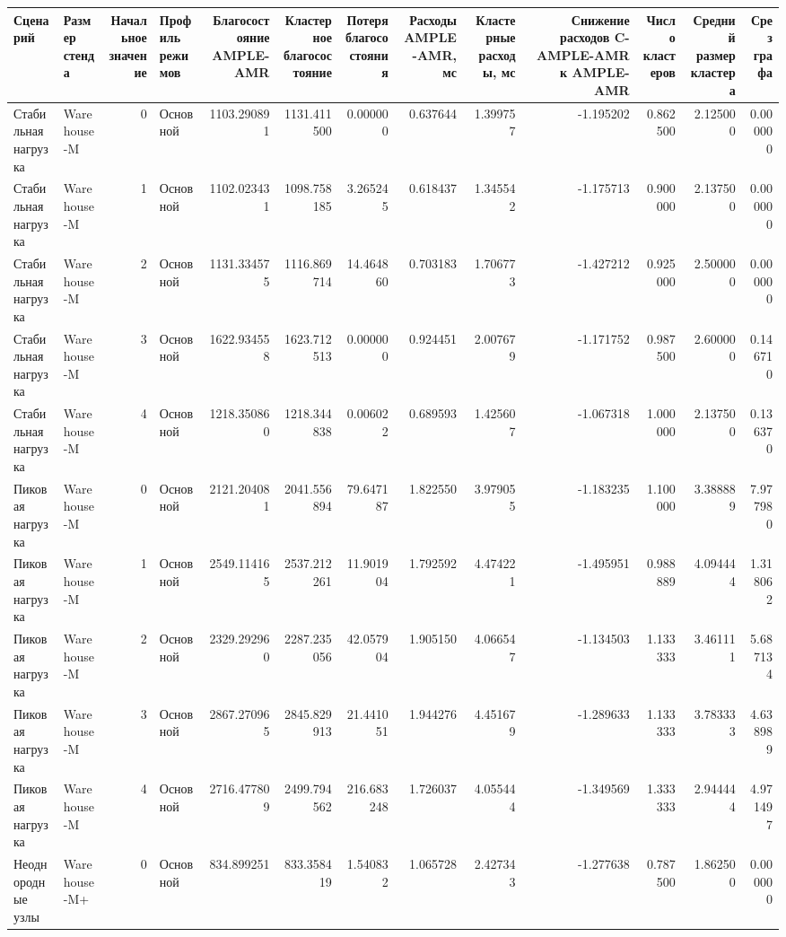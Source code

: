 \begin{tabular}{llrlrrrrrrrrr}
\toprule
 Сценарий & Размер стенда & Начальное значение & Профиль режимов & Благосостояние AMPLE-AMR & Кластерное благосостояние & Потеря благосостояния & Расходы AMPLE-AMR, мс & Кластерные расходы, мс & Снижение расходов C-AMPLE-AMR к AMPLE-AMR & Число кластеров & Средний размер кластера & Срез графа \\
\midrule
 Стабильная нагрузка & Warehouse-M & 0 & Основной & 1103.290891 & 1131.411500 & 0.000000 & 0.637644 & 1.399757 & -1.195202 & 0.862500 & 2.125000 & 0.000000 \\
 Стабильная нагрузка & Warehouse-M & 1 & Основной & 1102.023431 & 1098.758185 & 3.265245 & 0.618437 & 1.345542 & -1.175713 & 0.900000 & 2.137500 & 0.000000 \\
 Стабильная нагрузка & Warehouse-M & 2 & Основной & 1131.334575 & 1116.869714 & 14.464860 & 0.703183 & 1.706773 & -1.427212 & 0.925000 & 2.500000 & 0.000000 \\
 Стабильная нагрузка & Warehouse-M & 3 & Основной & 1622.934558 & 1623.712513 & 0.000000 & 0.924451 & 2.007679 & -1.171752 & 0.987500 & 2.600000 & 0.146710 \\
 Стабильная нагрузка & Warehouse-M & 4 & Основной & 1218.350860 & 1218.344838 & 0.006022 & 0.689593 & 1.425607 & -1.067318 & 1.000000 & 2.137500 & 0.136370 \\
 Пиковая нагрузка & Warehouse-M & 0 & Основной & 2121.204081 & 2041.556894 & 79.647187 & 1.822550 & 3.979055 & -1.183235 & 1.100000 & 3.388889 & 7.977980 \\
 Пиковая нагрузка & Warehouse-M & 1 & Основной & 2549.114165 & 2537.212261 & 11.901904 & 1.792592 & 4.474221 & -1.495951 & 0.988889 & 4.094444 & 1.318062 \\
 Пиковая нагрузка & Warehouse-M & 2 & Основной & 2329.292960 & 2287.235056 & 42.057904 & 1.905150 & 4.066547 & -1.134503 & 1.133333 & 3.461111 & 5.687134 \\
 Пиковая нагрузка & Warehouse-M & 3 & Основной & 2867.270965 & 2845.829913 & 21.441051 & 1.944276 & 4.451679 & -1.289633 & 1.133333 & 3.783333 & 4.638989 \\
 Пиковая нагрузка & Warehouse-M & 4 & Основной & 2716.477809 & 2499.794562 & 216.683248 & 1.726037 & 4.055444 & -1.349569 & 1.333333 & 2.944444 & 4.971497 \\
 Неоднородные узлы & Warehouse-M+ & 0 & Основной & 834.899251 & 833.358419 & 1.540832 & 1.065728 & 2.427343 & -1.277638 & 0.787500 & 1.862500 & 0.000000 \\

\end{tabular}

